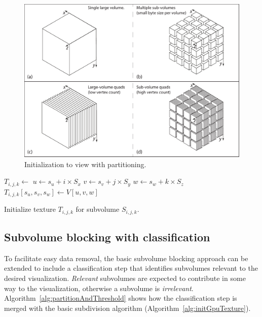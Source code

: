 \documentclass[journal]{vgtc}                %
\begin{document}
\begin{figure}[htb]\label{fig:volumeToSubvolumes}
	\begin{centering}
		\includegraphics[width=\linewidth,height=0.3\textheight,keepaspectratio]{volume_to_subvolumes_and_quads}
		\caption{Initialization to view with partitioning.}
	\end{centering}
\end{figure}

\begin{algorithm}[]  
	\begin{algorithmic}[1]
		\State $T_{i,j,k} \gets $  
		 
		\State $u \gets s_u + i \times S_x$ 
		\State $v \gets s_v + j \times S_y$ 
		\State $w \gets s_w + k \times S_z$ 
		\State $T_{i,j,k}\left[s_u, s_v, s_w \right] \gets V\left[u,v,w\right]$ 
		\EndFor
		\EndFor
		\EndFor
		\EndProcedure
	\end{algorithmic}
	\caption{Initialize texture $T_{i,j,k}$ for subvolume $S_{i,j,k}$.}
	\label{alg:initGpuTexture}
\end{algorithm}


\subsection{Subvolume blocking with classification}\label{sec:subvolumeBlockingWithClassification}

To facilitate easy data removal, the basic subvolume blocking approach can be
extended to include a classification step that identifies subvolumes relevant
to the desired visualization.  \textit{Relevant} subvolumes are expected to
contribute in some way to the visualization, otherwise a subvolume is
\textit{irrelevant}. Algorithm~\ref{alg:partitionAndThreshold} shows how the
classification step is merged  with the basic subdivision algorithm
(Algorithm~\ref{alg:initGpuTexture}).
\end{document}
